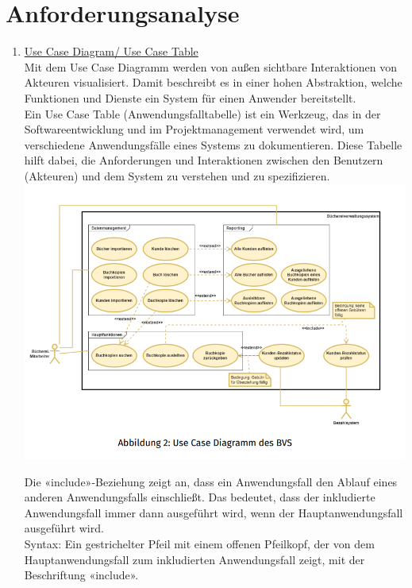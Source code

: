 \documentclass{article}
\begin{document}
\tableofcontents
\newpage
\section*{Anforderungsanalyse}
  \begin{enumerate}[label=\alph*)]
   \item
{}
   \underline{Use Case Diagram/ Use Case Table}\\
   
   Mit dem Use Case Diagramm werden von außen sichtbare Interaktionen von Akteuren visualisiert. Damit beschreibt es in einer hohen Abstraktion, welche Funktionen und Dienste ein System für einen Anwender bereitstellt.\\ Ein Use Case Table (Anwendungsfalltabelle) ist ein Werkzeug, das in der Softwareentwicklung und im Projektmanagement verwendet wird, um verschiedene Anwendungsfälle eines Systems zu dokumentieren. Diese Tabelle hilft dabei, die Anforderungen und Interaktionen zwischen den Benutzern (Akteuren) und dem System zu verstehen und zu spezifizieren.\\
  	\includegraphics[scale=1.1]{media/useCase.png}
  	
  	Die «include»-Beziehung zeigt an, dass ein Anwendungsfall den Ablauf eines anderen Anwendungsfalls einschließt. Das bedeutet, dass der inkludierte Anwendungsfall immer dann ausgeführt wird, wenn der Hauptanwendungsfall ausgeführt wird.\\
  	Syntax: Ein gestrichelter Pfeil mit einem offenen Pfeilkopf, der von dem Hauptanwendungsfall zum inkludierten Anwendungsfall zeigt, mit der Beschriftung «include».\\
  	

\end{enumerate}
\end{document}
